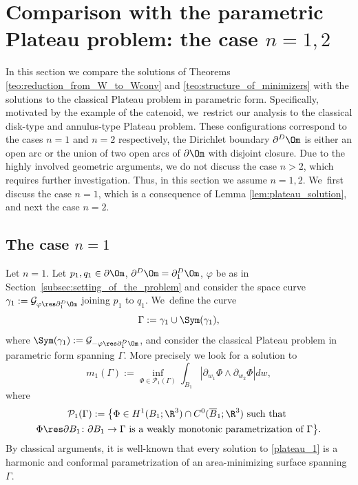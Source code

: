 \section{Comparison with the parametric Plateau problem: the case \texorpdfstring{$n=1,2$}{12}}
\label{sec:comparison_with_the_parametric_Plateau_problem:the_case_n=1,2}

In this section we compare the solutions of
Theorems \ref{teo:reduction_from_W_to_Wconv} and \ref{teo:structure_of_minimizers} with the solutions to the classical Plateau problem in parametric form.
Specifically, motivated by the example of the catenoid, we~restrict our analysis to the classical
disk-type and annulus-type Plateau problem.
These configurations correspond to the cases $n=1$ and $n=2$ respectively, \ie the Dirichlet boundary $\partial^D\Om$ is either an open arc or
the union of two open arcs of $\partial\Om$ with disjoint closure.
Due to the highly involved geometric arguments,
we do not discuss the case $n>2$, which requires further investigation.
Thus, in this section we assume $n=1,2$. We~first discuss the case $n=1$, which is a consequence of
Lemma \ref{lem:plateau_solution}, and next the case $n=2$.

\subsection{The case $n=1$}\label{sec:the_case_n=1}

Let $n=1$. Let $p_1,q_1\in\partial\Om$, $\partial^D\Om=\partial^D_1\Om$, $\varphi$ be as in Section~\ref{subsec:setting_of_the_problem} and
consider the space curve $\gamma_1:=\mathcal{G}_{\varphi\res\partial_1^D\Om}$ joining $p_1$ to $q_1$. We~define the curve
\[
\Gamma:=\gamma_1\cup \Sym(\gamma_1),
\]
where $\Sym(\gamma_1):=\mathcal{G}_{-\varphi\res\partial_1^D\Om}$,
and
consider the classical Plateau problem in parametric form
spanning $\Gamma$. More precisely we look for a solution to
\begin{equation}\label{plateau_1}
m_1(\Gamma):=\inf_{\Phi\in\mathcal{P}_1(\Gamma)}\int_{B_1}|\partial_{w_1}\Phi\wedge\partial_{w_2}\Phi|dw,
\end{equation}
where
\begin{multline}\label{def:adm_Phi}
\mathcal{P}_1(\Gamma):=\bigl\{\Phi\in H^1( B_1;\R^3)\cap C^0(\overline B_1;\R^3)\text{ such that }\\\Phi\res\partial B_1\colon\partial B_1\to\Gamma \text{ is a weakly monotonic parametrization of $\Gamma$}
\bigr\}.
\end{multline}
By classical arguments, it is well-known that
every solution to \eqref{plateau_1} is a harmonic and conformal parametrization of an area-minimizing surface spanning $\Gamma$.

